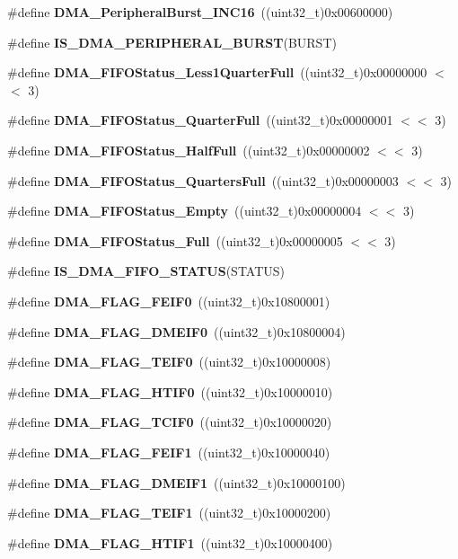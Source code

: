\begin{DoxyCompactItemize}
\#define \textbf{ D\+M\+A\+\_\+\+Peripheral\+Burst\+\_\+\+I\+N\+C16}~((uint32\+\_\+t)0x00600000)
\item 
\#define \textbf{ I\+S\+\_\+\+D\+M\+A\+\_\+\+P\+E\+R\+I\+P\+H\+E\+R\+A\+L\+\_\+\+B\+U\+R\+ST}(B\+U\+R\+ST)
\item 
\#define \textbf{ D\+M\+A\+\_\+\+F\+I\+F\+O\+Status\+\_\+\+Less1\+Quarter\+Full}~((uint32\+\_\+t)0x00000000 $<$$<$ 3)
\item 
\#define \textbf{ D\+M\+A\+\_\+\+F\+I\+F\+O\+Status\+\_\+Quarter\+Full}~((uint32\+\_\+t)0x00000001 $<$$<$ 3)
\item 
\#define \textbf{ D\+M\+A\+\_\+\+F\+I\+F\+O\+Status\+\_\+\+Half\+Full}~((uint32\+\_\+t)0x00000002 $<$$<$ 3)
\item 
\#define \textbf{ D\+M\+A\+\_\+\+F\+I\+F\+O\+Status\+\_\+Quarters\+Full}~((uint32\+\_\+t)0x00000003 $<$$<$ 3)
\item 
\#define \textbf{ D\+M\+A\+\_\+\+F\+I\+F\+O\+Status\+\_\+\+Empty}~((uint32\+\_\+t)0x00000004 $<$$<$ 3)
\item 
\#define \textbf{ D\+M\+A\+\_\+\+F\+I\+F\+O\+Status\+\_\+\+Full}~((uint32\+\_\+t)0x00000005 $<$$<$ 3)
\item 
\#define \textbf{ I\+S\+\_\+\+D\+M\+A\+\_\+\+F\+I\+F\+O\+\_\+\+S\+T\+A\+T\+US}(S\+T\+A\+T\+US)
\item 
\#define \textbf{ D\+M\+A\+\_\+\+F\+L\+A\+G\+\_\+\+F\+E\+I\+F0}~((uint32\+\_\+t)0x10800001)
\item 
\#define \textbf{ D\+M\+A\+\_\+\+F\+L\+A\+G\+\_\+\+D\+M\+E\+I\+F0}~((uint32\+\_\+t)0x10800004)
\item 
\#define \textbf{ D\+M\+A\+\_\+\+F\+L\+A\+G\+\_\+\+T\+E\+I\+F0}~((uint32\+\_\+t)0x10000008)
\item 
\#define \textbf{ D\+M\+A\+\_\+\+F\+L\+A\+G\+\_\+\+H\+T\+I\+F0}~((uint32\+\_\+t)0x10000010)
\item 
\#define \textbf{ D\+M\+A\+\_\+\+F\+L\+A\+G\+\_\+\+T\+C\+I\+F0}~((uint32\+\_\+t)0x10000020)
\item 
\#define \textbf{ D\+M\+A\+\_\+\+F\+L\+A\+G\+\_\+\+F\+E\+I\+F1}~((uint32\+\_\+t)0x10000040)
\item 
\#define \textbf{ D\+M\+A\+\_\+\+F\+L\+A\+G\+\_\+\+D\+M\+E\+I\+F1}~((uint32\+\_\+t)0x10000100)
\item 
\#define \textbf{ D\+M\+A\+\_\+\+F\+L\+A\+G\+\_\+\+T\+E\+I\+F1}~((uint32\+\_\+t)0x10000200)
\item 
\#define \textbf{ D\+M\+A\+\_\+\+F\+L\+A\+G\+\_\+\+H\+T\+I\+F1}~((uint32\+\_\+t)0x10000400)
\item 

\end{DoxyCompactItemize}
